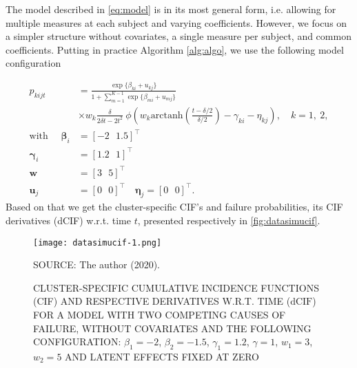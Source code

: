 The model described in \autoref{eq:model} is in its most general form,
i.e. allowing for multiple measures at each subject and varying
coefficients. However, we focus on a simpler structure without
covariates, a single measure per subject, and common coefficients.
Putting in practice Algorithm \autoref{alg:algo}, we use the following
model configuration

\begin{align}
  p_{kijt}
  &= \frac{\exp\{\beta_{ki} + u_{kj}\}}{
    1 + \sum_{m=1}^{K-1}\exp\{\beta_{mi} + u_{mj}\}}\nonumber\\
  &\times w_{k}\frac{\delta}{2\delta t - 2t^{2}}~
    \phi\left(
    w_{k}
    \text{arctanh}\left(\frac{t-\delta/2}{\delta/2}\right)
    - \gamma_{ki} - \eta_{kj}
    \right),\quad k = 1,~2,\nonumber\\
  \text{with }\quad
  \bm{\beta}_{i} &= [-2~~~1.5]^{\top}\nonumber\\
  \bm{\gamma}_{i} &= [1.2~~~1]^{\top}\label{eq:modelconfig}\\
  \bm{w} &= [3~~~5]^{\top}\nonumber\\
  \bm{u}_{j} &= [0~~~0]^{\top}\quad
               \bm{\eta}_{j} = [0~~~0]^{\top}\nonumber.
\end{align}
Based on that we get the cluster-specific CIF's and failure
probabilities, its CIF derivatives (dCIF) w.r.t. time \(t\), presented
respectively in \autoref{fig:datasimucif}.

\begin{figure}[H]
  \setlength{\abovecaptionskip}{.0001pt}
  \caption{CLUSTER-SPECIFIC CUMULATIVE INCIDENCE FUNCTIONS (CIF) AND
    RESPECTIVE DERIVATIVES W.R.T. TIME (\(\text{dCIF}\)) FOR A MODEL
    WITH TWO COMPETING CAUSES OF FAILURE, WITHOUT COVARIATES AND THE
    FOLLOWING CONFIGURATION: \(\beta_{1} = -2\), \(\beta_{2} = -1.5\),
    \(\gamma_{1} = 1.2\), \(\gamma = 1\), \(w_{1} = 3\), \(w_{2} = 5\)
    AND LATENT EFFECTS FIXED AT ZERO}
  \vspace{0.2cm} \centering
  \texttt{[image: datasimucif-1.png]}
  \\
  \begin{footnotesize}
    SOURCE: The author (2020).
  \end{footnotesize}
  \label{fig:datasimucif}
\end{figure}

